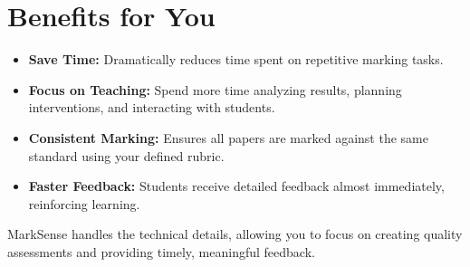\documentclass[11pt, a4paper]{article}
\begin{document}
\section*{Benefits for You}
\begin{itemize}
    \item \textbf{Save Time:} Dramatically reduces time spent on repetitive marking tasks.
    \item \textbf{Focus on Teaching:} Spend more time analyzing results, planning interventions, and interacting with students.
    \item \textbf{Consistent Marking:} Ensures all papers are marked against the same standard using your defined rubric.
    \item \textbf{Faster Feedback:} Students receive detailed feedback almost immediately, reinforcing learning.
\end{itemize}

MarkSense handles the technical details, allowing you to focus on creating quality assessments and providing timely, meaningful feedback.
\end{document}
